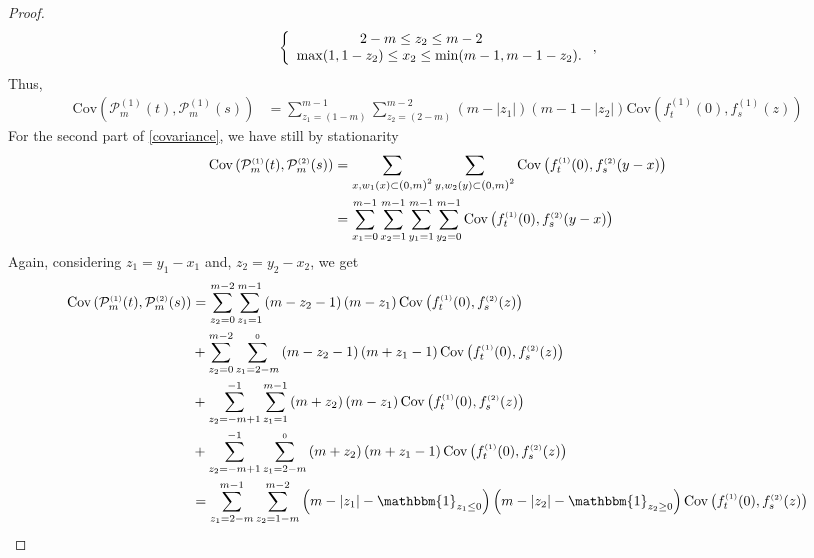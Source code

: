 \documentclass[12pt]{article}
\theoremstyle{Theorem}
\begin{document}
\begin{proof}
\begin{align*}
\left\{
\begin{array}{rcl}
2-m \leq z_2 \leq m-2 \hspace{2.5cm}  \\
\max(1, 1-z_2) \leq x_2 \leq \min(m-1 , m-1-z_2).
\end{array}\right., 
\end{align*}
Thus,
\begin{align*}
\text{Cov}\left(\mathcal{P}_{m}^{\scriptscriptstyle (1)}(t),\mathcal{P}_{m}^{\scriptscriptstyle (1)}(s) \right) &  = \sum_{z_{\scriptscriptstyle 1} = \left(1-m\right)}^{m-1}\sum_{z_{\scriptscriptstyle 2}=\left(2-m\right)}^{m-2}\left(m -|z_{1}|\right)\left(m - 1- |z_{2}|\right) \text{Cov}\left(f_{t}^{\scriptscriptstyle (1)}(0), f_{s}^{\scriptscriptstyle (1)}(z) \right) 
\end{align*}
For the second part of \eqref{covariance}, we have still by stationarity
\begin{align*}
\text{Cov}\left(\mathcal{P}_{m}^{\scriptscriptstyle (1)}(t),\mathcal{P}_{m}^{\scriptscriptstyle (2)}(s) \right) & = \sum_{x, w_{1}(x) \subset \text{\larger[1]{$($}}0, m \text{\larger[1]{$)$}}^{2}} \sum_{y, w_{2}(y) \subset \text{\larger[1]{$($}}0, m \text{\larger[1]{$)$}}^{2}} \text{Cov}\left(f_{t}^{\scriptscriptstyle (1)}(0), f_{s}^{ \scriptscriptstyle (2)}(y-x) \right)\\
& =  \sum_{x_1 = 0}^{m-1}\sum_{x_2 = 1}^{m-1}\sum_{y_1 = 1}^{m-1}\sum_{y_2 = 0}^{m-1}\text{Cov}\left(f_{t}^{\scriptscriptstyle (1)}(0), f_{s}^{ \scriptscriptstyle (2)}(y-x) \right)
\end{align*}
Again, considering $z_1 = y_1 - x_1$ and, $z_{2} = y_{2}-x_{2}$, we get
\begin{align*}
\text{Cov}\left(\mathcal{P}_{m}^{\scriptscriptstyle (1)}(t),\mathcal{P}_{m}^{\scriptscriptstyle (2)}(s) \right) & = \sum_{z_2 = 0}^{m-2} \sum_{z_1=1}^{m-1}\left(m-z_2-1\right)\left(m-z_1\right)\text{Cov}\left(f_{t}^{\scriptscriptstyle (1)}(0), f_{s}^{ \scriptscriptstyle (2)}(z) \right)\\
& + \sum_{z_2 = 0}^{m-2} \sum_{z_1=2-m}^{\scriptscriptstyle 0}\left(m-z_2-1\right)\left(m+z_1-1\right)\text{Cov}\left(f_{t}^{\scriptscriptstyle (1)}(0), f_{s}^{ \scriptscriptstyle (2)}(z) \right)\\
& + \sum_{z_2 = -m+1}^{-1} \sum_{z_1=1}^{m-1}\left(m+z_2\right)\left(m-z_1\right)\text{Cov}\left(f_{t}^{\scriptscriptstyle (1)}(0), f_{s}^{ \scriptscriptstyle (2)}(z) \right)\\
& + \sum_{z_2 = -m+1}^{-1} \sum_{z_1=2-m}^{\scriptscriptstyle 0}\left(m+z_2\right)\left(m+z_1-1\right)\text{Cov}\left(f_{t}^{\scriptscriptstyle (1)}(0), f_{s}^{ \scriptscriptstyle (2)}(z) \right) \\
& = \sum_{z_1=2-m}^{m-1} \sum_{z_2 = 1-m}^{m-2} \left(m-|z_1| - \mathbbm{1}_{z_{1} \leq 0}\right)\left(m-|z_2|-\mathbbm{1}_{z_{2} \geq 0}\right)\text{Cov}\left(f_{t}^{\scriptscriptstyle (1)}(0), f_{s}^{ \scriptscriptstyle (2)}(z) \right)
\end{align*}
\end{proof}
\end{document}
